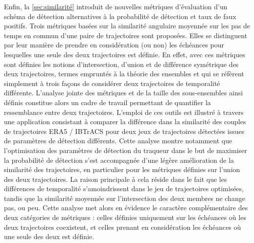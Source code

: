 \documentclass[../main.tex]{subfiles}
\begin{document}
Enfin, la \cref{sec:similarité} introduit de nouvelles métriques d'évaluation d'un schéma de détection alternatives à la probabilité de détection et taux de
faux positifs. Trois métriques basées sur la similarité angulaire moyennée sur les pas de temps en commun d'une paire de trajectoires sont proposées. Elles se
distinguent par leur manière de prendre en considération (ou non) les échéances pour lesquelles une seule des deux trajectoires est définie. En effet, avec ces
métriques sont définies les notions d'intersection, d'union et de différence symétrique des deux trajectoires, termes empruntés à la théorie des ensembles et
qui se réfèrent simplement à trois façons de considérer deux trajectoires de temporalité différente. L'analyse jointe des métriques et de la taille des
sous-ensembles ainsi définis constitue alors un cadre de travail permettant de quantifier la ressemblance entre deux trajectoires. L'emploi de ces outils est
illustré à travers une application consistant à comparer la différence dans la similarité des couples de trajectoires ERA5 / IBTrACS pour deux jeux de
trajectoires détectées issues de paramètres de détection différents. Cette analyse montre notamment que l'optimisation des paramètres de détection du traqueur
dans le but de maximiser la probabilité de détection s'est accompagnée d'une légère amélioration de la similarité des trajectoires, en particulier pour les
métriques définies sur l'union des deux trajectoires. La raison principale à cela réside dans le fait que les différences de temporalité s'amoindrissent dans le
jeu de trajectoires optimisées, tandis que la similarité moyennée sur l'intersection des deux membres ne change pas, ou peu. Cette analyse met alors en évidence
le caractère complémentaire des deux catégories de métriques : celles définies uniquement sur les échéances où les deux trajectoires coexistent, et celles
prenant en considération les échéances où une seule des deux est définie.
\end{document}
